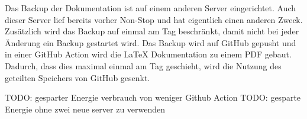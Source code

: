 Das Backup der Dokumentation ist auf einem anderen Server eingerichtet. Auch dieser Server lief bereits vorher Non-Stop und hat eigentlich einen anderen Zweck. Zusätzlich wird das Backup auf einmal am Tag beschränkt, damit nicht bei jeder Änderung ein Backup gestartet wird. Das Backup wird auf GitHub gepusht und in einer GitHub Action wird die LaTeX Dokumentation zu einem PDF gebaut. Dadurch, dass dies maximal einmal am Tag geschieht, wird die Nutzung des geteilten Speichers von GitHub gesenkt.

TODO: gesparter Energie verbrauch von weniger Github Action
TODO: gesparte Energie ohne zwei neue server zu verwenden

